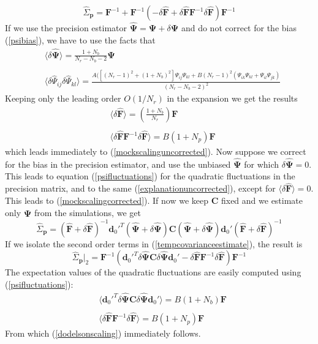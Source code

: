 \documentclass[reprint,aps,prd,superscriptaddress,showkeys,showpacs]{revtex4-1}
\newcommand{\bb}[1]{\mathbf{#1}}
\newcommand{\bbh}[1]{\mathbf{\hat{#1}}}
\newcommand{\h}[1]{\hat{#1}}
\begin{document}
\begin{equation}
\h{\Sigma}_\bb{p} = \bb{F}^{-1} + \bb{F}^{-1}\left(- \delta{\bbh{F}}+ \delta{\bbh{F}}\bb{F}^{-1}\delta{\bbh{F}}\right)\bb{F}^{-1}  
\end{equation}  
%
If we use the precision estimator $\bbh{\Psi}=\bb{\Psi}+\delta\bbh{\Psi}$ and do not correct for the bias (\ref{psibias}), we have to use the facts that
\begin{equation}
\begin{matrix}
& \langle\delta\bbh{\Psi}\rangle = \frac{1+N_b}{N_r-N_b-2}\bb{\Psi} \\ \\
& \langle\delta\h{\Psi}_{ij}\delta\h{\Psi}_{kl}\rangle = \frac{A([(N_r-1)^2+(1+N_b)^2]\Psi_{ij}\Psi_{kl} + B(N_r-1)^2(\Psi_{ik}\Psi_{kl}+\Psi_{il}\Psi_{jk})}{(N_r-N_b-2)^2}
\end{matrix}
\end{equation}
%
Keeping only the leading order $O(1/N_r)$ in the expansion we get the results
\begin{equation}
\label{explanationuncorrected}
\begin{matrix}
& \langle\delta\bbh{F}\rangle = \left(\frac{1+N_b}{N_r}\right)\bb{F} \\ \\
& \langle\delta{\bbh{F}}\bb{F}^{-1}\delta{\bbh{F}}\rangle = B(1+N_p)\bb{F}
\end{matrix}
\end{equation}
%
which leads immediately to (\ref{mockscalinguncorrected}). Now suppose we correct for the bias in the precision estimator, and use the unbiased $\bbh{\Psi}$ for which $\delta\bbh{\Psi}=0$. This leads to equation (\ref{psifluctuations}) for the quadratic fluctuations in the precision matrix, and to the same (\ref{explanationuncorrected}), except for $\langle\delta\bbh{F}\rangle=0$. This leads to (\ref{mockscalingcorrected}). If now we keep $\bb{C}$ fixed and we estimate only $\bbh{\Psi}$ from the simulations, we get
\begin{equation}
\label{tempcovarianceestimate}
\h{\Sigma}_\bb{p} = (\bbh{F}+\delta\bbh{F})^{-1}\bb{d}_0'^T(\bbh{\Psi}+\delta\bbh{\Psi})\bb{C}(\bbh{\Psi}+\delta\bbh{\Psi})\bb{d}_0'(\bbh{F}+\delta\bbh{F})^{-1}
\end{equation}
%
If we isolate the second order terms in (\ref{tempcovarianceestimate}), the result is 
\begin{equation}
\h{\Sigma}_\bb{p}\vert_2 = \bb{F}^{-1}(\bb{d}_0'^T\delta\bbh{\Psi}\bb{C}\delta\bbh{\Psi}\bb{d}_0'-\delta{\bbh{F}}\bb{F}^{-1}\delta{\bbh{F}})\bb{F}^{-1}
\end{equation} 
%
The expectation values of the quadratic fluctuations are easily computed using (\ref{psifluctuations}):
\begin{equation}
\begin{matrix}
& \langle\bb{d}_0'^T\delta\bbh{\Psi}\bb{C}\delta\bbh{\Psi}\bb{d}_0'\rangle = B(1+N_b)\bb{F} \\ \\
& \langle\delta{\bbh{F}}\bb{F}^{-1}\delta{\bbh{F}}\rangle = B(1+N_p)\bb{F}
\end{matrix}
\end{equation}
%
From which (\ref{dodelsonscaling}) immediately follows. 
\label{lastpage}
\end{document}
